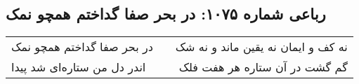 \begin{center}
\section*{رباعی شماره ۱۰۷۵: در بحر صفا گداختم همچو نمک}
\label{sec:1075}
\begin{longtable}{l p{0.5cm} r}
در بحر صفا گداختم همچو نمک
&&
نه کف و ایمان نه یقین ماند و نه شک
\\
اندر دل من ستاره‌ای شد پیدا
&&
گم گشت در آن ستاره هر هفت فلک
\\
\end{longtable}
\end{center}
